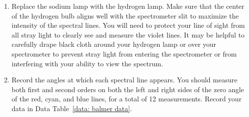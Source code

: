 \documentclass[addpoints]{physlabs}
\begin{document}
\begin{labsection}
\begin{experiment}
\begin{enumerate}
    \item Replace the sodium lamp with the hydrogen lamp. 
    Make sure that the center of the hydrogen bulb aligns well with the spectrometer slit to maximize the intensity of the spectral lines. 
    You will need to protect your line of sight from all stray light to clearly see and measure the violet lines. 
    It may be helpful to carefully drape black cloth around your hydrogen lamp or over your spectrometer to prevent stray light from entering the spectrometer or from interfering with your ability to view the spectrum.
    \item Record the angles at which each spectral line appears. You should measure both first and second orders on both the left and right sides of the zero angle of the red, cyan, and blue lines, for a total of 12 measurements. Record your data in Data Table~\ref{data: balmer data}.
\end{enumerate}

\end{experiment}

\end{labsection}
\end{document}
